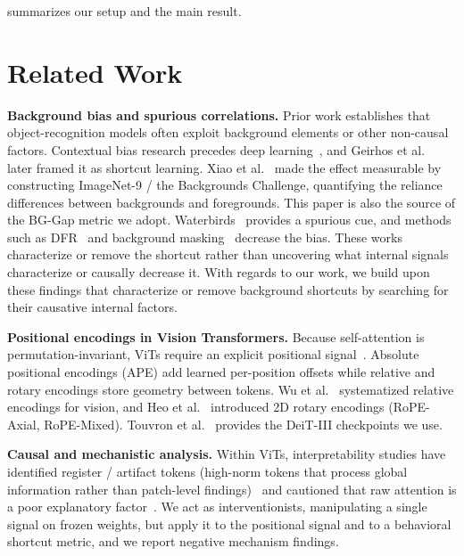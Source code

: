 \documentclass[10pt,twocolumn,letterpaper]{article}
\begin{document}
 summarizes our setup and the main result.

\section{Related Work}

\noindent\textbf{Background bias and spurious correlations.} Prior work establishes that object-recognition models often exploit background elements or other non-causal factors. Contextual bias research precedes deep learning~\cite{torralba2003,zhang2007}, and Geirhos et al.~\cite{geirhos2020} later framed it as shortcut learning. Xiao et al.~\cite{xiao2021} made the effect measurable by constructing ImageNet-9 / the Backgrounds Challenge, quantifying the reliance differences between backgrounds and foregrounds. This paper is also the source of the BG-Gap metric we adopt. Waterbirds~\cite{sagawa2020} provides a spurious cue, and methods such as DFR~\cite{kirichenko2023} and background masking~\cite{aniraj2023} decrease the bias. These works characterize or remove the shortcut rather than uncovering what internal signals characterize or causally decrease it. With regards to our work, we build upon these findings that characterize or remove background shortcuts by searching for their causative internal factors.

\noindent\textbf{Positional encodings in Vision Transformers.} Because self-attention is permutation-invariant, ViTs require an explicit positional signal~\cite{dosovitskiy2021}. Absolute positional encodings (APE) add learned per-position offsets while relative and rotary encodings store geometry between tokens. Wu et al.~\cite{wu2021} systematized relative encodings for vision, and Heo et al.~\cite{heo2024} introduced 2D rotary encodings (RoPE-Axial, RoPE-Mixed). Touvron et al.~\cite{touvron2022} provides the DeiT-III checkpoints we use.

\noindent\textbf{Causal and mechanistic analysis.} Within ViTs, interpretability studies have identified register / artifact tokens (high-norm tokens that process global information rather than patch-level findings)~\cite{darcet2024} and cautioned that raw attention is a poor explanatory factor~\cite{jain2019}. We act as interventionists, manipulating a single signal on frozen weights, but apply it to the positional signal and to a behavioral shortcut metric, and we report negative mechanism findings.
\end{document}
